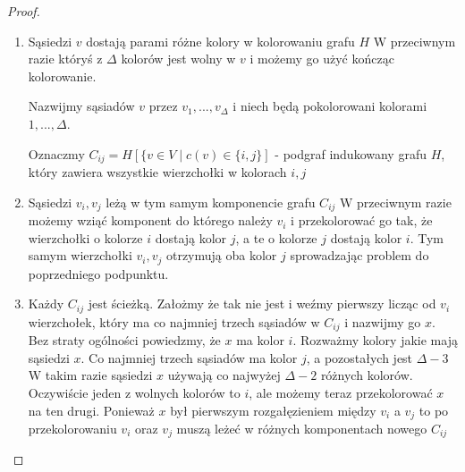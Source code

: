 \begin{proof}
\begin{enumerate}
            \item Sąsiedzi $v$ dostają parami różne kolory w kolorowaniu grafu $H$ 
                W przeciwnym razie któryś z $\Delta$ kolorów jest wolny w $v$ i możemy go użyć kończąc kolorowanie. 
                
                Nazwijmy sąsiadów $v$ przez $v_1, ..., v_\Delta$ i niech będą pokolorowani kolorami $1, ..., \Delta$.
                
                Oznaczmy $C_{ij} = H[\{v \in V \mid c(v) \in \{i, j\}]$ - podgraf indukowany
                grafu $H$, który zawiera wszystkie wierzchołki w kolorach $i, j$
                
            \item Sąsiedzi $v_i, v_j$ leżą w tym samym komponencie grafu $C_{ij}$ 
                W przeciwnym razie możemy wziąć komponent do którego należy $v_i$
                i przekolorować go tak, że wierzchołki o kolorze $i$ dostają kolor $j$,
                a te o kolorze $j$ dostają kolor $i$. Tym samym wierzchołki $v_i, v_j$
                otrzymują oba kolor $j$ sprowadzając problem do poprzedniego podpunktu.
                
            \item Każdy $C_{ij}$ jest ścieżką. 
                Założmy że tak nie jest i weźmy pierwszy licząc od $v_i$ wierzchołek, który ma co najmniej trzech sąsiadów w $C_{ij}$ i nazwijmy go $x$.
                Bez straty ogólności powiedzmy, że $x$ ma kolor $i$.
                Rozważmy kolory jakie mają sąsiedzi $x$.
                Co najmniej trzech sąsiadów ma kolor $j$, a pozostałych jest $\Delta - 3$
                W takim razie sąsiedzi $x$ używają co najwyżej $\Delta - 2$ różnych kolorów. Oczywiście jeden z wolnych kolorów to $i$, ale możemy teraz przekolorować $x$ na ten drugi.
                Ponieważ $x$ był pierwszym rozgałęzieniem między $v_i$ a $v_j$ 
                to po przekolorowaniu $v_i$ oraz $v_j$ muszą leżeć w różnych komponentach nowego $C_{ij}$ 
                

\end{enumerate}
\end{proof}
